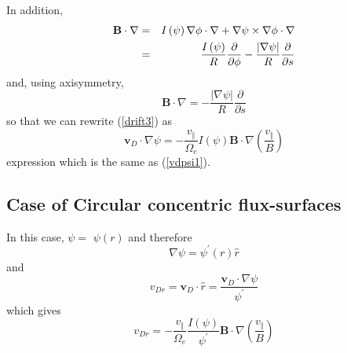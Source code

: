 In addition,
\begin{eqnarray}
\mathbf{B}\cdot \nabla  &=&I\left( \psi \right) \nabla \phi \cdot \nabla
+\nabla \psi \times \nabla \phi \cdot \nabla   \nonumber \\
&=&\frac{I\left( \psi \right) }{R}\frac{\partial }{\partial \phi }-\frac{%
\left| \nabla \psi \right| }{R}\frac{\partial }{\partial s}
\end{eqnarray}
and, using axisymmetry,
\begin{equation}
\mathbf{B}\cdot \nabla =-\frac{\left| \nabla \psi \right| }{R}\frac{\partial
}{\partial s}
\end{equation}
so that we can rewrite (\ref{drift3}) as
\begin{equation}
\mathbf{v}_{D}\cdot \nabla \psi =-\frac{v_{\Vert }}{\Omega _{e}}I\left( \psi
\right) \mathbf{B}\cdot \nabla \left( \frac{v_{\Vert }}{B}\right)
\label{vdpsi2}
\end{equation}
expression which is the same as (\ref{vdpsi1}).

\subsection{Case of Circular concentric flux-surfaces}

In this case, $\psi =$ $\psi \left( r\right) $ and therefore
\begin{equation}
\nabla \psi =\psi ^{\prime }\left( r\right) \widehat{r}
\end{equation}
and
\begin{equation}
v_{Dr}=\mathbf{v}_{D}\cdot \widehat{r}=\frac{\mathbf{v}_{D}\cdot \nabla \psi
}{\psi ^{\prime }}
\end{equation}
which gives
\begin{equation}
v_{Dr}=-\frac{v_{\Vert }}{\Omega _{e}}\frac{I\left( \psi \right) }{\psi
^{\prime }}\mathbf{B}\cdot \nabla \left( \frac{v_{\Vert }}{B}\right)
\end{equation}

